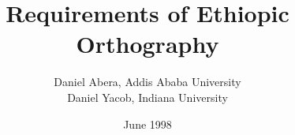 \documentclass[twocolumn,a4paper]{article}
\begin{document}
\title{Requirements of Ethiopic Orthography}

\author{Daniel Abera, Addis Ababa University\\ Daniel Yacob, Indiana University}

\date{June 1998}


\maketitle
\thispagestyle{empty}


\newpage
\onecolumn

\end{document}
